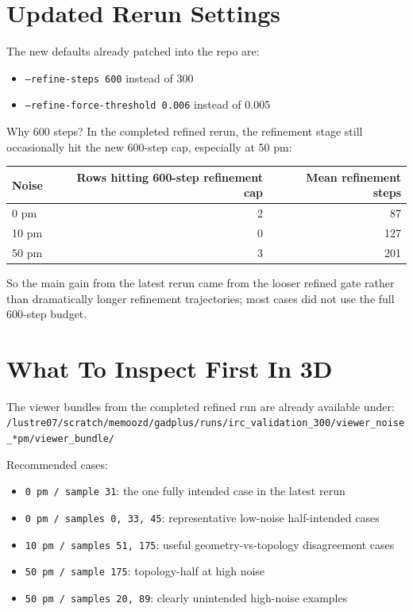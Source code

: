 \documentclass[11pt]{article}
\begin{document}
\section*{Updated Rerun Settings}

The new defaults already patched into the repo are:

\begin{itemize}[nosep,leftmargin=1.5em]
\item \texttt{--refine-steps 600} instead of 300
\item \texttt{--refine-force-threshold 0.006} instead of 0.005
\end{itemize}

Why 600 steps? In the completed refined rerun, the refinement stage still
occasionally hit the new 600-step cap, especially at 50 pm:
\begin{center}
\begin{tabular}{lrr}
\toprule
Noise & Rows hitting 600-step refinement cap & Mean refinement steps \\
\midrule
0 pm  &  2 & 87 \\
10 pm &  0 & 127 \\
50 pm &  3 & 201 \\
\bottomrule
\end{tabular}
\end{center}

So the main gain from the latest rerun came from the looser refined gate rather
than dramatically longer refinement trajectories; most cases did not use the full
600-step budget.

\section*{What To Inspect First In 3D}

The viewer bundles from the completed refined run are already available under:
\texttt{/lustre07/scratch/memoozd/gadplus/runs/irc\_validation\_300/viewer\_noise\_*pm/viewer\_bundle/}

Recommended cases:
\begin{itemize}[nosep,leftmargin=1.5em]
\item \texttt{0 pm / sample 31}: the one fully intended case in the latest rerun
\item \texttt{0 pm / samples 0, 33, 45}: representative low-noise half-intended cases
\item \texttt{10 pm / samples 51, 175}: useful geometry-vs-topology disagreement cases
\item \texttt{50 pm / sample 175}: topology-half at high noise
\item \texttt{50 pm / samples 20, 89}: clearly unintended high-noise examples
\end{itemize}
\end{document}
